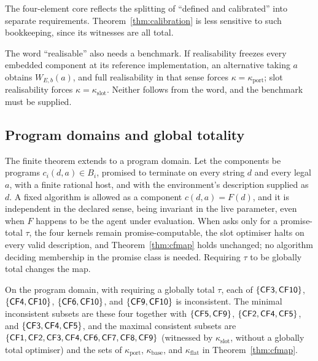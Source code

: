 The four-element core reflects the splitting of \enquote{defined and calibrated} into separate
requirements. Theorem~\ref{thm:calibration} is less sensitive to such bookkeeping, since its witnesses
are all total.

The word \enquote{realisable} also needs a benchmark. If realisability freezes every embedded
component at its reference implementation, an alternative taking $a$ obtains $W_{E,b}(a)$, and full
realisability in that sense forces $\kappa=\kappa_{\mathrm{port}}$; slot realisability forces
$\kappa=\kappa_{\mathrm{slot}}$. Neither follows from the word, and the benchmark must be supplied.

\subsection{Program domains and global totality}\label{sec:programmap}

The finite theorem extends to a program domain. Let the components be programs $c_i(d,a)\in B_i$,
promised to terminate on every string $d$ and every legal $a$, with a finite rational host, and with the
environment's description supplied as $d$. A fixed algorithm is allowed as a component $c(d,a)=F(d)$,
and it is independent in the declared sense, being invariant in the live parameter, even when $F$
happens to be the agent under evaluation. When  asks only for a promise-total $\tau$, the four
kernels remain promise-computable, the slot optimiser halts on every valid description, and
Theorem~\ref{thm:cfmap} holds unchanged; no algorithm deciding membership in the promise class is
needed. Requiring $\tau$ to be globally total changes the map.

\begin{proposition}\label{prop:globalmap}
On the program domain, with  requiring a globally total $\tau$, each of
$\{\textup{\textsf{CF3}},\textup{\textsf{CF10}}\}$, $\{\textup{\textsf{CF4}},\textup{\textsf{CF10}}\}$, $\{\textup{\textsf{CF6}},\textup{\textsf{CF10}}\}$, and $\{\textup{\textsf{CF9}},\textup{\textsf{CF10}}\}$ is
inconsistent. The minimal inconsistent subsets are these four together with $\{\textup{\textsf{CF5}},\textup{\textsf{CF9}}\}$,
$\{\textup{\textsf{CF2}},\textup{\textsf{CF4}},\textup{\textsf{CF5}}\}$, and $\{\textup{\textsf{CF3}},\textup{\textsf{CF4}},\textup{\textsf{CF5}}\}$, and the maximal consistent subsets are
$\{\textup{\textsf{CF1}},\textup{\textsf{CF2}},\textup{\textsf{CF3}},\textup{\textsf{CF4}},\textup{\textsf{CF6}},\textup{\textsf{CF7}},\textup{\textsf{CF8}},\textup{\textsf{CF9}}\}$ (witnessed by
$\kappa_{\mathrm{slot}}$, without a globally total optimiser) and the sets of $\kappa_{\mathrm{port}}$,
$\kappa_{\mathrm{base}}$, and $\kappa_{\mathrm{flat}}$ in Theorem~\ref{thm:cfmap}.
\end{proposition}

